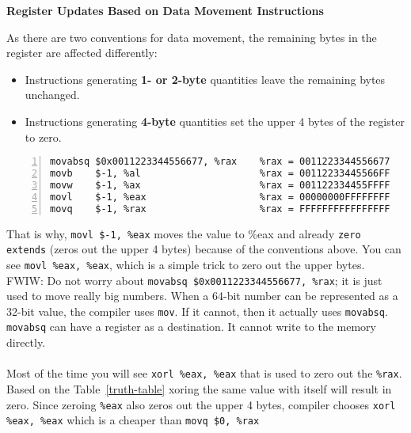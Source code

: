 \documentclass{article}
\begin{document}
\noindent\textbf{Register Updates Based on Data Movement Instructions}

\vspace{5pt}

As there are two conventions for data movement, the remaining bytes in the register are affected differently:
\begin{itemize}
    \item Instructions generating \textbf{1- or 2-byte} quantities leave the remaining bytes unchanged.
    \item Instructions generating \textbf{4-byte} quantities set the upper 4 bytes of the register to zero.
\end{itemize}

\vspace{10pt}

\begin{lstlisting}[basicstyle=\ttfamily, frame=none, numbers=left, numberstyle=\color{blue}]
movabsq $0x0011223344556677, %rax    %rax = 0011223344556677
movb    $-1, %al                     %rax = 00112233445566FF
movw    $-1, %ax                     %rax = 001122334455FFFF
movl    $-1, %eax                    %rax = 00000000FFFFFFFF
movq    $-1, %rax                    %rax = FFFFFFFFFFFFFFFF
\end{lstlisting}

That is why, \texttt{movl \$-1, \%eax} moves the value to \%eax and already \texttt{zero extends} (zeros out the upper 4 bytes) because of the conventions above. You can see \texttt{movl \%eax, \%eax}, which is a simple trick to zero out the upper bytes. \\

FWIW: Do not worry about \texttt{movabsq \$0x0011223344556677, \%rax}; it is just used to move really big numbers. When a 64-bit number can be represented as a 32-bit value, the compiler uses \texttt{mov}. If it cannot, then it actually uses \texttt{movabsq}. \texttt{movabsq} can have a register as a destination. It cannot write to the memory directly. \\
\\
Most of the time you will see \texttt{xorl \%eax, \%eax} that is used to zero out the \texttt{\%rax}. Based on the Table~\ref{truth-table} xoring the same value with itself will result in zero. Since zeroing \texttt{\%eax} also zeros out the upper 4 bytes, compiler chooses \texttt{xorl \%eax, \%eax} which is a cheaper than \texttt{movq \$0, \%rax}\\
\end{document}
